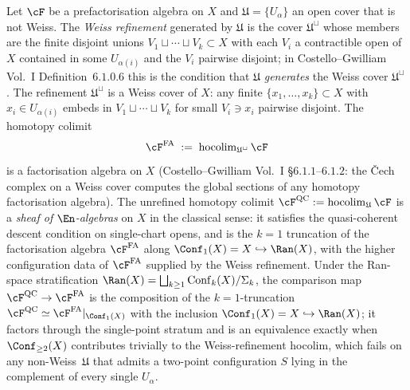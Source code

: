 \begin{proposition}
\label{prop:weiss-refinement-upgrade}
Let $\cF$ be a prefactorisation algebra on $X$ and $\mathfrak U = \{U_\alpha\}$ an open cover that is not Weiss. The \emph{Weiss refinement} generated by $\mathfrak U$ is the cover $\mathfrak U^\sqcup$ whose members are the finite disjoint unions $V_1 \sqcup \cdots \sqcup V_k \subset X$ with each $V_i$ a contractible open of $X$ contained in some $U_{\alpha(i)}$ and the $V_i$ pairwise disjoint; in Costello--Gwilliam Vol.~I Definition~$6.1.0.6$ this is the condition that $\mathfrak U$ \emph{generates} the Weiss cover $\mathfrak U^\sqcup$. The refinement $\mathfrak U^\sqcup$ is a Weiss cover of $X$: any finite $\{x_1, \ldots, x_k\} \subset X$ with $x_i \in U_{\alpha(i)}$ embeds in $V_1 \sqcup \cdots \sqcup V_k$ for small $V_i \ni x_i$ pairwise disjoint. The homotopy colimit
\[
 \cF^{\mathrm{FA}} \;:=\; \mathrm{hocolim}_{\mathfrak U^\sqcup}\, \cF
\]
is a factorisation algebra on $X$ \textup{(}Costello--Gwilliam Vol.~I \S$6.1.1$--$6.1.2$: the Čech complex on a Weiss cover computes the global sections of any homotopy factorisation algebra\textup{).} The unrefined homotopy colimit $\cF^{\mathrm{QC}} := \mathrm{hocolim}_{\mathfrak U}\, \cF$ is a \emph{sheaf of $\En$-algebras} on $X$ in the classical sense: it satisfies the quasi-coherent descent condition on single-chart opens, and is the $k=1$ truncation of the factorisation algebra $\cF^{\mathrm{FA}}$ along $\Conf_1(X) = X \hookrightarrow \Ran(X)$, with the higher configuration data of $\cF^{\mathrm{FA}}$ supplied by the Weiss refinement. Under the Ran-space stratification $\Ran(X) = \bigsqcup_{k \geq 1} \mathrm{Conf}_k(X) / \Sigma_k$, the comparison map $\cF^{\mathrm{QC}} \to \cF^{\mathrm{FA}}$ is the composition of the $k = 1$-truncation $\cF^{\mathrm{QC}} \simeq \cF^{\mathrm{FA}}|_{\Conf_1(X)}$ with the inclusion $\Conf_1(X) = X \hookrightarrow \Ran(X)$; it factors through the single-point stratum and is an equivalence exactly when $\Conf_{\geq 2}(X)$ contributes trivially to the Weiss-refinement hocolim, which fails on any non-Weiss~$\mathfrak U$ that admits a two-point configuration $S$ lying in the complement of every single $U_\alpha$.
\end{proposition}

